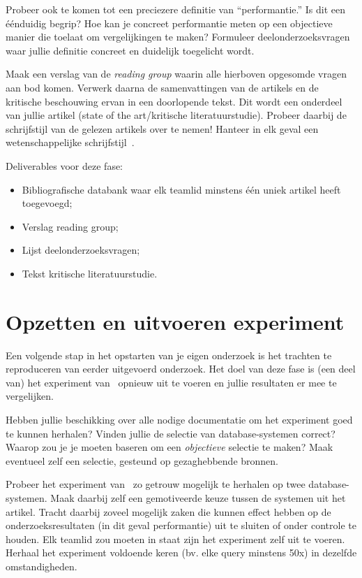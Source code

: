 \documentclass[fleqn,10pt]{voorstel}
\begin{document}
Probeer ook te komen tot een preciezere definitie van ``performantie.'' Is dit een éénduidig begrip? Hoe kan je concreet performantie meten op een objectieve manier die toelaat om vergelijkingen te maken? Formuleer deelonderzoeksvragen waar jullie definitie concreet en duidelijk toegelicht wordt.

Maak een verslag van de \emph{reading group} waarin alle hierboven opgesomde vragen aan bod komen. Verwerk daarna de samenvattingen van de artikels en de kritische beschouwing ervan in een doorlopende tekst. Dit wordt een onderdeel van jullie artikel (state of the art/kritische literatuurstudie). Probeer daarbij de schrijfstijl van de gelezen artikels over te nemen! Hanteer in elk geval een wetenschappelijke schrijfstijl~\autocite{Taalwinkel2014}.

Deliverables voor deze fase:

\begin{itemize}
  \item Bibliografische databank waar elk teamlid minstens één uniek artikel heeft toegevoegd;
  \item Verslag reading group;
  \item Lijst deelonderzoeksvragen;
  \item Tekst kritische literatuurstudie.
\end{itemize}

\section{Opzetten en uitvoeren experiment}

Een volgende stap in het opstarten van je eigen onderzoek is het trachten te reproduceren van eerder uitgevoerd onderzoek. Het doel van deze fase is (een deel van) het experiment van~\textcite{Bassil2012} opnieuw uit te voeren en jullie resultaten er mee te vergelijken.

Hebben jullie beschikking over alle nodige documentatie om het experiment goed te kunnen herhalen? Vinden jullie de selectie van database-systemen correct? Waarop zou je je moeten baseren om een \emph{objectieve} selectie te maken? Maak eventueel zelf een selectie, gesteund op gezaghebbende bronnen.

Probeer het experiment van~\textcite{Bassil2012} zo getrouw mogelijk te herhalen op twee database-systemen. Maak daarbij zelf een gemotiveerde keuze tussen de systemen uit het artikel. Tracht daarbij zoveel mogelijk zaken die kunnen effect hebben op de onderzoeksresultaten (in dit geval performantie) uit te sluiten of onder controle te houden. Elk teamlid zou moeten in staat zijn het experiment zelf uit te voeren. Herhaal het experiment voldoende keren (bv. elke query minstens 50x) in dezelfde omstandigheden. 
\end{document}

